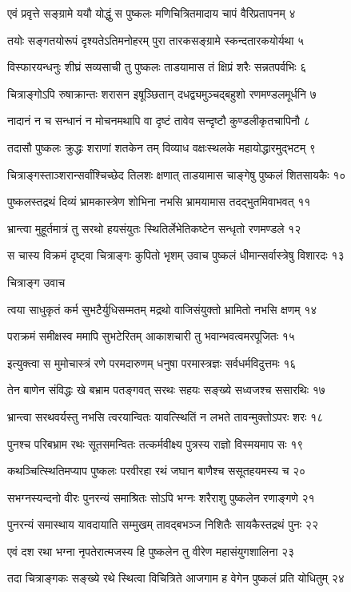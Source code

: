 एवं प्रवृत्ते सङ्ग्रामे ययौ योद्धुं स पुष्कलः
मणिचित्रितमादाय चापं वैरिप्रतापनम् ४

तयोः सङ्गतयोरूपं दृश्यतेऽतिमनोहरम्
पुरा तारकसङ्ग्रामे स्कन्दतारकयोर्यथा ५

विस्फारयन्धनुः शीघ्रं सव्यसाची तु पुष्कलः
ताडयामास तं क्षिप्रं शरैः सन्नतपर्वभिः ६

चित्राङ्गोऽपि रुषाक्रान्तः शरासन इषूञ्छितान्
दधद्व्यमुञ्चद्बहुशो रणमण्डलमूर्धनि ७

नादानं न च सन्धानं न मोचनमथापि वा
दृष्टं तावेव सन्दृष्टौ कुण्डलीकृतचापिनौ ८

तदासौ पुष्कलः क्रुद्धः शराणां शतकेन तम्
विव्याध वक्षःस्थलके महायोद्धारमुद्भटम् ९

चित्राङ्गस्ताञ्शरान्सर्वांश्चिच्छेद तिलशः क्षणात्
ताडयामास चाङ्गेषु पुष्कलं शितसायकैः १०

पुष्कलस्तद्रथं दिव्यं भ्रामकास्त्रेण शोभिना
नभसि भ्रामयामास तदद्भुतमिवाभवत् ११

भ्रान्त्वा मुहूर्तमात्रं तु सरथो हयसंयुतः
स्थितिर्लेभेतिकष्टेन सन्धृतो रणमण्डले १२

स चास्य विक्रमं दृष्ट्वा चित्राङ्गः कुपितो भृशम्
उवाच पुष्कलं धीमान्सर्वास्त्रेषु विशारदः १३

चित्राङ्ग उवाच

त्वया साधुकृतं कर्म सुभटैर्युधिसम्मतम्
मद्रथो वाजिसंयुक्तो भ्रामितो नभसि क्षणम् १४

पराक्रमं समीक्षस्व ममापि सुभटेरितम्
आकाशचारी तु भवान्भवत्वमरपूजितः १५

इत्युक्त्वा स मुमोचास्त्रं रणे परमदारुणम्
धनुषा परमास्त्रज्ञः सर्वधर्मविदुत्तमः १६

तेन बाणेन संविद्धः खे बभ्राम पतङ्गवत्
सरथः सहयः सङ्ख्ये सध्वजश्च ससारथिः १७

भ्रान्त्वा सरथवर्यस्तु नभसि त्वरयान्वितः
यावत्स्थितिं न लभते तावन्मुक्तोऽपरः शरः १८

पुनश्च परिबभ्राम रथः सूतसमन्वितः
तत्कर्मवीक्ष्य पुत्रस्य राज्ञो विस्मयमाप सः १९

कथञ्चित्स्थितिमप्याप पुष्कलः परवीरहा
रथं जघान बाणैश्च ससूतहयमस्य च २०

सभग्नस्यन्दनो वीरः पुनरन्यं समाश्रितः
सोऽपि भग्नः शरैराशु पुष्कलेन रणाङ्गणे २१

पुनरन्यं समास्थाय यावदायाति सम्मुखम्
तावद्बभञ्ज निशितैः सायकैस्तद्रथं पुनः २२

एवं दश रथा भग्ना नृपतेरात्मजस्य हि
पुष्कलेन तु वीरेण महासंयुगशालिना २३

तदा चित्राङ्गकः सङ्ख्ये रथे स्थित्वा विचित्रिते
आजगाम ह वेगेन पुष्कलं प्रति योधितुम् २४

